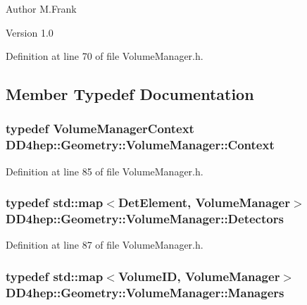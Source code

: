 \begin{DoxyAuthor}{Author}
M.Frank 
\end{DoxyAuthor}
\begin{DoxyVersion}{Version}
1.0 
\end{DoxyVersion}


Definition at line 70 of file VolumeManager.h.

\subsection{Member Typedef Documentation}
\hypertarget{class_d_d4hep_1_1_geometry_1_1_volume_manager_adadb14f2ccbeaad001b7bc6ddb6dc715}{
\subsubsection[{Context}]{\setlength{\rightskip}{0pt plus 5cm}typedef {\bf VolumeManagerContext} {\bf DD4hep::Geometry::VolumeManager::Context}}}
\label{class_d_d4hep_1_1_geometry_1_1_volume_manager_adadb14f2ccbeaad001b7bc6ddb6dc715}


Definition at line 85 of file VolumeManager.h.\hypertarget{class_d_d4hep_1_1_geometry_1_1_volume_manager_a89d31fb00522aa56dfa2708fedaf1e4f}{
\subsubsection[{Detectors}]{\setlength{\rightskip}{0pt plus 5cm}typedef std::map$<${\bf DetElement}, {\bf VolumeManager}$>$ {\bf DD4hep::Geometry::VolumeManager::Detectors}}}
\label{class_d_d4hep_1_1_geometry_1_1_volume_manager_a89d31fb00522aa56dfa2708fedaf1e4f}


Definition at line 87 of file VolumeManager.h.\hypertarget{class_d_d4hep_1_1_geometry_1_1_volume_manager_ad60f5618f569c6604861b6e0eb1c71c9}{
\subsubsection[{Managers}]{\setlength{\rightskip}{0pt plus 5cm}typedef std::map$<${\bf VolumeID}, {\bf VolumeManager}$>$ {\bf DD4hep::Geometry::VolumeManager::Managers}}}
\label{class_d_d4hep_1_1_geometry_1_1_volume_manager_ad60f5618f569c6604861b6e0eb1c71c9}


